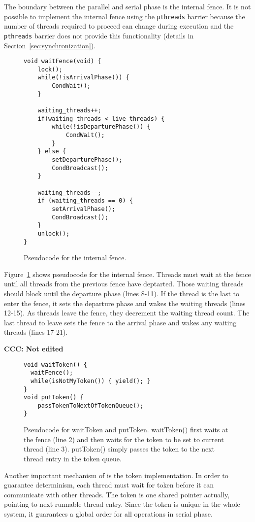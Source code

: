The boundary between the parallel and serial phase is the internal fence.  
It is not possible to implement the internal fence using the \texttt{pthreads} barrier 
because the number of threads required to proceed can change during execution and the \texttt{pthreads} barrier does not provide this functionality (details in Section~\ref{sec:synchronization}).

\label{sec:token}
\begin{figure}
\begin{lstlisting}
void waitFence(void) {
	lock();
	while(!isArrivalPhase()) { 
		CondWait();
	}

	waiting_threads++;
	if(waiting_threads < live_threads) {
		while(!isDeparturePhase()) {
			CondWait();
		}
	} else {
		setDeparturePhase();
		CondBroadcast();
	}

	waiting_threads--;
	if (waiting_threads == 0) {
		setArrivalPhase();
		CondBroadcast();
	}
	unlock();
}
\end{lstlisting}
\caption{Pseudocode for the internal fence.\label{fig:internalFence}}
\end{figure}

Figure~\ref{fig:internalFence} shows pseudocode for the internal fence.  Threads must wait at the fence 
until all threads from the previous 
fence have deptarted. Those waiting threads should block until the departure phase (lines 8-11). 
If the thread is the last to enter the fence, it sets the departure phase and wakes the waiting threads (lines 12-15).  
As threads leave the fence, they decrement the waiting thread count.  The last thread to leave sets the fence to the arrival phase and wakes any waiting threads (lines 17-21).

\textbf{CCC: Not edited}

\begin{figure}
\begin{lstlisting}
void waitToken() {
  waitFence();
  while(isNotMyToken()) { yield(); }
}
void putToken() {
    passTokenToNextOfTokenQueue();
}
\end{lstlisting}
\caption{Pseudocode for waitToken and putToken. waitToken() first waits at the fence (line 2) and then waits for
the token to be set to current thread (line 3).  putToken() simply
passes the token to the next thread entry in the token queue.
\label{fig:token}}
\end{figure}

Another important mechanism of \dthreads{} is the token implementation. 
In order to guarantee determinism, each thread must wait for token
before it can communicate with other threads. 
The token is one shared pointer actually, pointing to next runnable thread entry.
Since the token is unique in the whole system, it guarantees a global order for
all operations in serial phase. 

